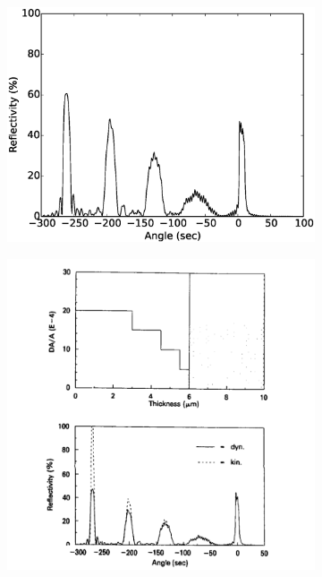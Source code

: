 \documentclass[12pt,oneside,notitlepage,abstracton,a4paper]{scrartcl}
\begin{document}
\begin{figure}
 \centering
 \begin{subfigure}[h]{0.49\textwidth}
  \includegraphics[width=\textwidth]{pics/GaAs.eps}
  \caption{}
  \label{GaAs}
 \end{subfigure}
 \begin{subfigure}[h]{0.49\textwidth}
  \includegraphics[width=\textwidth]{pics/GaAs.png}
  \caption{}
  \label{GaAs_article}
 \end{subfigure}
 \caption{}\label{GaAs_both}
\end{figure}
\end{document}
